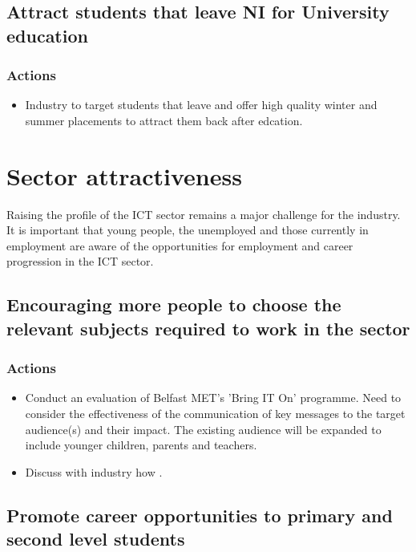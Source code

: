 \subsection{Attract students that leave NI for University education}

\subsubsection{Actions}

\begin{itemize}
    \item Industry to target students that leave and offer high quality winter and summer placements to attract them back after edcation.
\end{itemize}

\section{Sector attractiveness}
\label{sec:sectorAttractiveness}

Raising the profile of the ICT sector remains a major challenge for the industry. It is important that young people, the unemployed and those currently in employment are aware of the opportunities for employment and career progression in the ICT sector.

\subsection{Encouraging more people to choose the relevant subjects required to work in the sector}

\subsubsection{Actions}

\begin{itemize}
    \item Conduct an evaluation of Belfast MET’s 'Bring IT On' programme. Need to consider the effectiveness of the communication of key messages to the target audience(s) and their impact. The existing audience will be expanded to include younger children, parents and teachers.
    \item Discuss with industry how .
\end{itemize}

\subsection{Promote career opportunities to primary and second level students}


